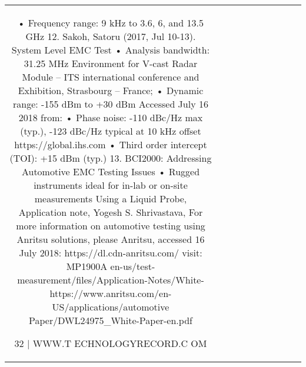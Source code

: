 \begin{table}[h!]
\begin{tabular}{|c|c|c|c|c|c|c|c|c|c|}
  • Frequency range: 9 kHz to 3.6, 6, and 13.5 GHz                                                                    12.    Sakoh, Satoru (2017, Jul 10-13). System Level EMC Test
  • Analysis bandwidth: 31.25 MHz                                                                                          Environment for V-cast Radar Module – ITS international
                                                                                                                            conference and Exhibition, Strasbourg – France;
  • Dynamic range: -155 dBm to +30 dBm                                                                                      Accessed July 16 2018 from:
  • Phase noise: -110 dBc/Hz max (typ.), -123 dBc/Hz typical at 10 kHz offset
                                                                                                                            https://global.ihs.com
  • Third order intercept (TOI): +15 dBm (typ.)
                                                                                                                     13.    BCI2000: Addressing Automotive EMC Testing Issues
  • Rugged instruments ideal for in-lab or on-site measurements                                                             Using a Liquid Probe, Application note, Yogesh S. Shrivastava,
    For more information on automotive testing using Anritsu solutions, please                                              Anritsu, accessed 16 July 2018: https://dl.cdn-anritsu.com/
    visit:                                                                              MP1900A
                                                                                                                            en-us/test-measurement/files/Application-Notes/White-
    https://www.anritsu.com/en-US/applications/automotive                                                                   Paper/DWL24975_White-Paper-en.pdf

32 |                                                                                                                             WWW.T ECHNOLOGYRECORD.C OM


\end{tabular}
\end{table}
